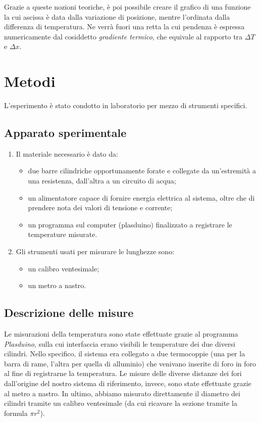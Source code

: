 \documentclass{article}
\begin{document}
\noindent Grazie a queste nozioni teoriche, è poi possibile creare il grafico di una funzione la cui ascissa è data dalla variazione di posizione, mentre l'ordinata dalla differenza di temperatura. Ne verrà fuori una retta la cui pendenza è espressa numericamente dal cosiddetto \emph{gradiente termico}, che equivale al rapporto tra $\Delta T$ e $\Delta x$.

\FloatBarrier

\section{Metodi}
L'esperimento è stato condotto in laboratorio per mezzo di strumenti specifici.

\subsection{Apparato sperimentale}

\begin{enumerate}
    \item Il materiale necessario è dato da:
    \begin{itemize}
        \item due barre cilindriche opportunamente forate e collegate da un'estremità a una resistenza, dall'altra a un circuito di acqua;
        \item un alimentatore capace di fornire energia elettrica al sistema, oltre che di prendere nota dei valori di tensione e corrente;
        \item un programma sul computer (plasduino) finalizzato a registrare le temperature misurate.
    \end{itemize}

    \item Gli strumenti usati per misurare le lunghezze sono:
    \begin{itemize}
        \item un calibro ventesimale;
        \item un metro a nastro.
 \end{itemize}
\end{enumerate}

\subsection{Descrizione delle misure}
Le misurazioni della temperatura sono state effettuate grazie al programma \textit{Plasduino}, sulla cui interfaccia erano visibili le temperature dei due diversi cilindri. Nello specifico, il sistema era collegato a due termocoppie (una per la barra di rame, l'altra per quella di alluminio) che venivano inserite di foro in foro al fine di registrarne la temperatura. Le misure delle diverse distanze dei fori dall'origine del nostro sistema di riferimento, invece, sono state effettuate grazie al metro a nastro. In ultimo, abbiamo misurato direttamente il diametro dei cilindri tramite un calibro ventesimale (da cui ricavare la sezione tramite la formula $\pi r^{2}$).
\end{document}
